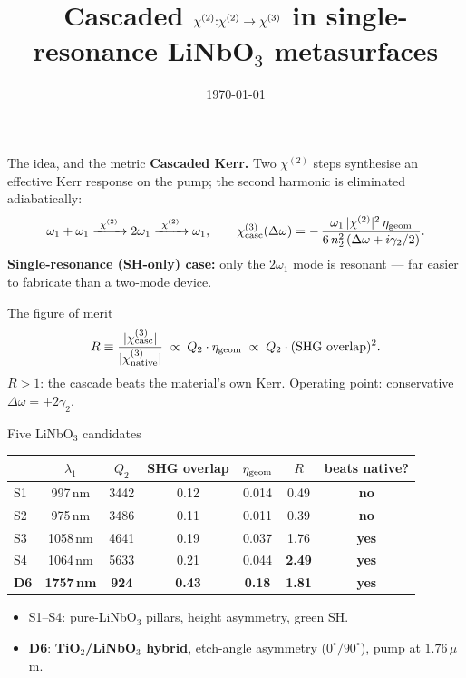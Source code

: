 \documentclass[aspectratio=169,11pt]{beamer}
\title{Cascaded $\chitwo{:}\chitwo \to \chithree$ in single-resonance
       LiNbO$_3$ metasurfaces}
\date{\today}
\newcommand{\chitwo}{\chi^{(2)}}
\newcommand{\chicasc}{\chi^{(3)}_{\mathrm{casc}}}
\newcommand{\chinat}{\chi^{(3)}_{\mathrm{native}}}
\newcommand{\Dom}{\Delta\omega}
\newcommand{\gtwo}{\gamma_2}
\newcommand{\yes}{\textcolor{good}{\textbf{yes}}}
\newcommand{\no}{\textcolor{bad}{\textbf{no}}}
\begin{document}
\maketitle

\begin{frame}{The idea, and the metric}
  \textbf{Cascaded Kerr.} Two $\chitwo$ steps synthesise an effective Kerr
  response on the pump; the second harmonic is eliminated adiabatically:
  \[
    \omega_1+\omega_1 \xrightarrow{\ \chitwo\ } 2\omega_1
    \xrightarrow{\ \chitwo\ } \omega_1 ,
    \qquad
    \chicasc(\Dom)= -\,\frac{\omega_1\,|\chitwo|^2\,\eta_{\rm geom}}
                              {6\,n_2^2\,(\Dom+i\gtwo/2)} .
  \]
  \textbf{Single-resonance (SH-only) case:} only the $2\omega_1$ mode is
  resonant --- far easier to fabricate than a two-mode device.

  \begin{alertblock}{The figure of merit}
    \[
      R \equiv \frac{|\chicasc|}{|\chinat|}\;\propto\; Q_2\cdot\eta_{\rm geom}
        \;\propto\; Q_2\cdot(\text{SHG overlap})^2 .
    \]
    $R>1$: the cascade beats the material's own Kerr. Operating point:
    conservative $\Dom=+2\gtwo$.
  \end{alertblock}
\end{frame}

\begin{frame}{Five LiNbO$_3$ candidates}
  \small
  \begin{table}
  \centering
  \begin{tabular}{@{}lccccc c@{}}
    \toprule
    & $\lambda_1$ & $Q_2$ & SHG overlap & $\eta_{\rm geom}$ & $R$ & beats native? \\
    \midrule
    S1 & 997\,nm  & 3442 & 0.12 & 0.014 & 0.49 & \no \\
    S2 & 975\,nm  & 3486 & 0.11 & 0.011 & 0.39 & \no \\
    S3 & 1058\,nm & 4641 & 0.19 & 0.037 & 1.76 & \yes \\
    S4 & 1064\,nm & 5633 & 0.21 & 0.044 & \textbf{2.49} & \yes \\
    \textcolor{d6}{\textbf{D6}} & \textbf{1757\,nm} & \textbf{924} & \textbf{0.43} & \textbf{0.18} & \textbf{1.81} & \yes \\
    \bottomrule
  \end{tabular}
  \end{table}
  \begin{itemize}\setlength\itemsep{1pt}
    \item S1--S4: pure-LiNbO$_3$ pillars, height asymmetry, green SH.
    \item \textcolor{d6}{\textbf{D6}}: \textbf{TiO$_2$/LiNbO$_3$ hybrid}, etch-angle asymmetry
          ($0^\circ/90^\circ$), pump at $1.76\,\mu$m.
  \end{itemize}
\end{frame}
\end{document}
